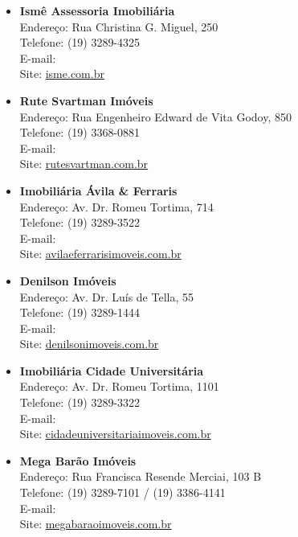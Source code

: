 \begin{itemize}
\item \textbf{Ismê Assessoria Imobiliária}
  \\Endereço: Rua Christina G. Miguel, 250
  \\Telefone: (19) 3289-4325
  \\E-mail: 
  \\Site: \url{isme.com.br}

\item \textbf{Rute Svartman Imóveis}
  \\Endereço: Rua Engenheiro Edward de Vita Godoy, 850
  \\Telefone: (19) 3368-0881
  \\E-mail: 
  \\Site: \url{rutesvartman.com.br}

\item \textbf{Imobiliária Ávila \& Ferraris}
  \\Endereço: Av. Dr. Romeu Tortima, 714
  \\Telefone: (19) 3289-3522
  \\E-mail: 
  \\Site: \url{avilaeferrarisimoveis.com.br}

\item \textbf{Denilson Imóveis}
  \\Endereço: Av. Dr. Luís de Tella, 55
  \\Telefone: (19) 3289-1444
  \\E-mail: 
  \\Site: \url{denilsonimoveis.com.br}

\item \textbf{Imobiliária Cidade Universitária}
  \\Endereço: Av. Dr. Romeu Tortima, 1101
  \\Telefone: (19) 3289-3322
  \\E-mail: 
  \\Site: \url{cidadeuniversitariaimoveis.com.br}

\item \textbf{Mega Barão Imóveis}
  \\Endereço: Rua Francisca Resende Merciai, 103 B
  \\Telefone: (19) 3289-7101 / (19) 3386-4141
  \\E-mail: 
  \\Site: \url{megabaraoimoveis.com.br}


\end{itemize}
